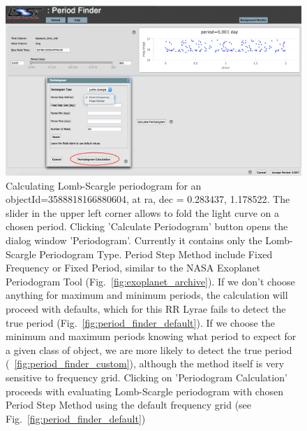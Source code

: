 \documentclass[DM,lsstdraft,toc,usenatbib]{lsstdoc}
\begin{document}
\begin{figure}
\includegraphics[width=\textwidth]{figs/Period_finder_initial}
\caption{Calculating Lomb-Scargle periodogram for an objectId=3588818166880604, at ra, dec = 0.283437\degree, 1.178522\degree. The slider in the upper left corner allows to fold the light curve on a chosen period. Clicking 'Calculate Periodogram' button opens the dialog window 'Periodogram'. Currently it contains only the Lomb-Scargle Periodogram Type. Period Step Method include Fixed Frequency or Fixed Period, similar to the NASA Exoplanet Periodogram Tool (Fig.~\ref{fig:exoplanet_archive}). If we don't choose anything for maximum and minimum periods, the calculation will proceed with defaults, which for this RR Lyrae fails to detect the true period (Fig.~\ref{fig:period_finder_default}). If we choose the minimum and maximum periods knowing what period to expect for a given class of object, we are more likely to detect the true period (~\ref{fig:period_finder_custom}), although the method itself is very sensitive to frequency grid. Clicking on 'Periodogram Calculation' proceeds with evaluating Lomb-Scargle periodogram with chosen Period Step Method using the default frequency grid (see Fig.~\ref{fig:period_finder_default}) }
\label{fig:period_finder_initial}
\end{figure}
\end{document}
